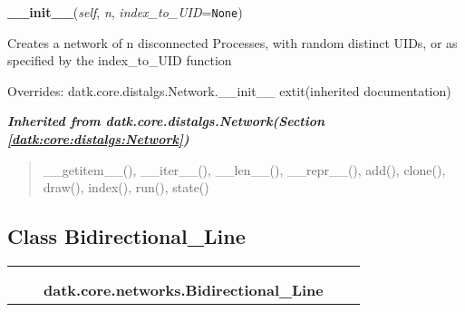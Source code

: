 \hspace{.8\funcindent}\begin{boxedminipage}{\funcwidth}

    \raggedright \textbf{\_\_init\_\_}(\textit{self}, \textit{n}, \textit{index\_to\_UID}={\tt None})

\setlength{\parskip}{2ex}
    Creates a network of n disconnected Processes, with random distinct 
    UIDs, or as specified by the index\_to\_UID function

\setlength{\parskip}{1ex}
      Overrides: datk.core.distalgs.Network.\_\_init\_\_ 	extit{(inherited documentation)}

    \end{boxedminipage}


\large{\textbf{\textit{Inherited from datk.core.distalgs.Network\textit{(Section \ref{datk:core:distalgs:Network})}}}}

\begin{quote}
\_\_getitem\_\_(), \_\_iter\_\_(), \_\_len\_\_(), \_\_repr\_\_(), add(), clone(), draw(), index(), run(), state()
\end{quote}


\subsection{Class Bidirectional\_Line}

    \label{datk:core:networks:Bidirectional_Line}
\begin{tabular}{cccccc}
\multicolumn{2}{r}{\settowidth{\BCL}{datk.core.distalgs.Network}\multirow{2}{\BCL}{datk.core.distalgs.Network}}
&&
  \\\cline{3-3}
  &&\multicolumn{1}{c|}{}
&&
  \\
&&\multicolumn{2}{l}{\textbf{datk.core.networks.Bidirectional\_Line}}
\end{tabular}

